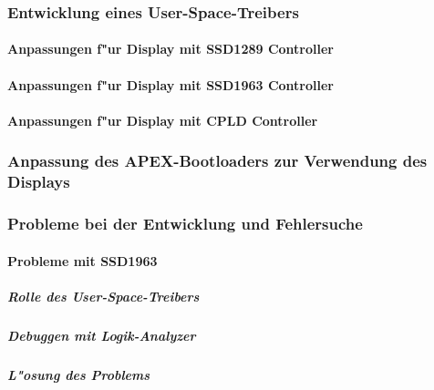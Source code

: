 \subsubsection{Entwicklung eines User-Space-Treibers}
\paragraph{Anpassungen f"ur Display mit SSD1289 Controller}
\paragraph{Anpassungen f"ur Display mit SSD1963 Controller}
\paragraph{Anpassungen f"ur Display mit CPLD Controller}
\subsubsection{Anpassung des APEX-Bootloaders zur Verwendung des Displays}
\subsubsection{Probleme bei der Entwicklung und Fehlersuche}
\paragraph{Probleme mit SSD1963}
\subparagraph{Rolle des User-Space-Treibers}
\subparagraph{Debuggen mit Logik-Analyzer}
\subparagraph{L"osung des Problems}


